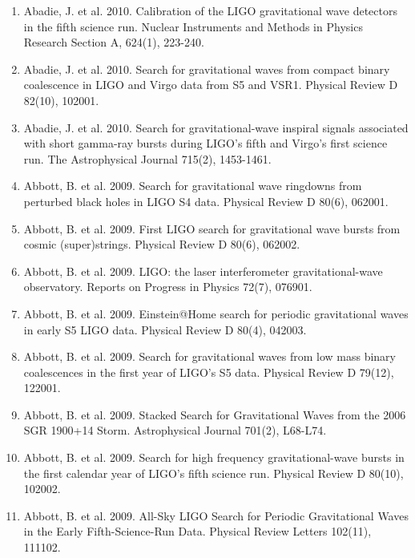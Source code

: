 \documentclass[margin,line]{res}
\begin{document}
\begin{resume}
\begin{enumerate}
\item Abadie, J. et al. 2010. Calibration of the LIGO gravitational wave detectors in the fifth science run. Nuclear Instruments and Methods in Physics Research Section A, 624(1), 223-240. 

\item Abadie, J. et al. 2010. Search for gravitational waves from compact binary coalescence in LIGO and Virgo data from S5 and VSR1. Physical Review D 82(10), 102001. 

\item Abadie, J. et al. 2010. Search for gravitational-wave inspiral signals associated with short gamma-ray bursts during LIGO's fifth and Virgo's first science run. The Astrophysical Journal 715(2), 1453-1461. 

\item Abbott, B. et al. 2009. Search for gravitational wave ringdowns from perturbed black holes in LIGO S4 data. Physical Review D 80(6), 062001. 

\item Abbott, B. et al. 2009. First LIGO search for gravitational wave bursts from cosmic (super)strings. Physical Review D 80(6), 062002. 

\item Abbott, B. et al. 2009. LIGO: the laser interferometer gravitational-wave observatory. Reports on Progress in Physics 72(7), 076901. 

\item Abbott, B. et al. 2009. Einstein@Home search for periodic gravitational waves in early S5 LIGO data. Physical Review D 80(4), 042003. 

\item Abbott, B. et al. 2009. Search for gravitational waves from low mass binary coalescences in the first year of LIGO's S5 data. Physical Review D 79(12), 122001. 

\item Abbott, B. et al. 2009. Stacked Search for Gravitational Waves from the 2006 SGR 1900+14 Storm. Astrophysical Journal 701(2), L68-L74. 

\item Abbott, B. et al. 2009. Search for high frequency gravitational-wave bursts in the first calendar year of LIGO's fifth science run. Physical Review D 80(10),  102002. 

\item Abbott, B. et al. 2009. All-Sky LIGO Search for Periodic Gravitational Waves in the Early Fifth-Science-Run Data. Physical Review Letters 102(11), 111102. 


\end{enumerate}
\end{resume}
\end{document}
